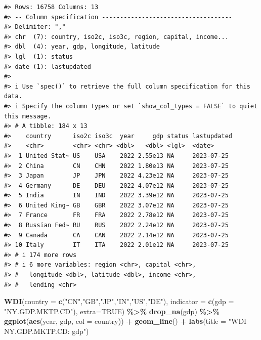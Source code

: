 \documentclass[
  xelatex, ja=standard]{bxjsbook}
\newenvironment{Shaded}{\begin{snugshade}}{\end{snugshade}}
\newcommand{\AttributeTok}[1]{\textcolor[rgb]{0.13,0.29,0.53}{#1}}
\newcommand{\ConstantTok}[1]{\textcolor[rgb]{0.56,0.35,0.01}{#1}}
\newcommand{\FunctionTok}[1]{\textcolor[rgb]{0.13,0.29,0.53}{\textbf{#1}}}
\newcommand{\NormalTok}[1]{#1}
\newcommand{\SpecialCharTok}[1]{\textcolor[rgb]{0.81,0.36,0.00}{\textbf{#1}}}
\newcommand{\StringTok}[1]{\textcolor[rgb]{0.31,0.60,0.02}{#1}}
\theoremstyle{definition}
\theoremstyle{definition}
\theoremstyle{definition}
\theoremstyle{definition}
\theoremstyle{remark}
\begin{document}
\begin{verbatim}
#> Rows: 16758 Columns: 13
#> -- Column specification ------------------------------------
#> Delimiter: ","
#> chr  (7): country, iso2c, iso3c, region, capital, income...
#> dbl  (4): year, gdp, longitude, latitude
#> lgl  (1): status
#> date (1): lastupdated
#> 
#> i Use `spec()` to retrieve the full column specification for this data.
#> i Specify the column types or set `show_col_types = FALSE` to quiet this message.
#> # A tibble: 184 x 13
#>    country      iso2c iso3c  year     gdp status lastupdated
#>    <chr>        <chr> <chr> <dbl>   <dbl> <lgl>  <date>     
#>  1 United Stat~ US    USA    2022 2.55e13 NA     2023-07-25 
#>  2 China        CN    CHN    2022 1.80e13 NA     2023-07-25 
#>  3 Japan        JP    JPN    2022 4.23e12 NA     2023-07-25 
#>  4 Germany      DE    DEU    2022 4.07e12 NA     2023-07-25 
#>  5 India        IN    IND    2022 3.39e12 NA     2023-07-25 
#>  6 United King~ GB    GBR    2022 3.07e12 NA     2023-07-25 
#>  7 France       FR    FRA    2022 2.78e12 NA     2023-07-25 
#>  8 Russian Fed~ RU    RUS    2022 2.24e12 NA     2023-07-25 
#>  9 Canada       CA    CAN    2022 2.14e12 NA     2023-07-25 
#> 10 Italy        IT    ITA    2022 2.01e12 NA     2023-07-25 
#> # i 174 more rows
#> # i 6 more variables: region <chr>, capital <chr>,
#> #   longitude <dbl>, latitude <dbl>, income <chr>,
#> #   lending <chr>
\end{verbatim}

\begin{Shaded}
\begin{Highlighting}[]
\FunctionTok{WDI}\NormalTok{(}\AttributeTok{country =} \FunctionTok{c}\NormalTok{(}\StringTok{"CN"}\NormalTok{,}\StringTok{"GB"}\NormalTok{,}\StringTok{"JP"}\NormalTok{,}\StringTok{"IN"}\NormalTok{,}\StringTok{"US"}\NormalTok{,}\StringTok{"DE"}\NormalTok{), }\AttributeTok{indicator =} \FunctionTok{c}\NormalTok{(}\AttributeTok{gdp =} \StringTok{"NY.GDP.MKTP.CD"}\NormalTok{), }\AttributeTok{extra=}\ConstantTok{TRUE}\NormalTok{) }\SpecialCharTok{\%\textgreater{}\%} \FunctionTok{drop\_na}\NormalTok{(gdp) }\SpecialCharTok{\%\textgreater{}\%} 
  \FunctionTok{ggplot}\NormalTok{(}\FunctionTok{aes}\NormalTok{(year, gdp, }\AttributeTok{col =}\NormalTok{ country)) }\SpecialCharTok{+} \FunctionTok{geom\_line}\NormalTok{() }\SpecialCharTok{+}
  \FunctionTok{labs}\NormalTok{(}\AttributeTok{title =} \StringTok{"WDI NY.GDP.MKTP.CD: gdp"}\NormalTok{)}
\end{Highlighting}
\end{Shaded}
\end{document}
